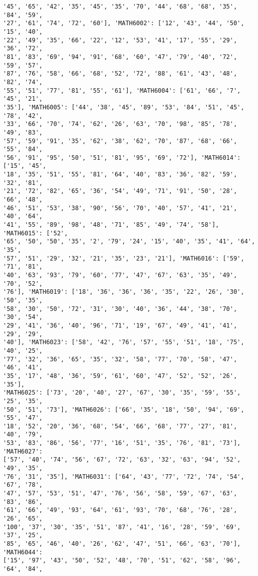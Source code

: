 \documentclass[11pt]{article}
\begin{document}
\begin{Verbatim}[commandchars=\\\{\}]
'45', '65', '42', '35', '45', '35', '70', '44', '68', '68', '35', '84', '59',
'27', '61', '74', '72', '60'], 'MATH6002': ['12', '43', '44', '50', '15', '40',
'22', '49', '35', '66', '22', '12', '53', '41', '17', '55', '29', '36', '72',
'81', '83', '69', '94', '91', '68', '60', '47', '79', '40', '72', '59', '57',
'87', '76', '58', '66', '68', '52', '72', '88', '61', '43', '48', '82', '74',
'55', '51', '77', '81', '55', '61'], 'MATH6004': ['61', '66', '7', '45', '21',
'35'], 'MATH6005': ['44', '38', '45', '89', '53', '84', '51', '45', '78', '42',
'33', '66', '70', '74', '62', '26', '63', '70', '98', '85', '78', '49', '83',
'57', '59', '91', '35', '62', '38', '62', '70', '87', '68', '66', '55', '84',
'56', '91', '95', '50', '51', '81', '95', '69', '72'], 'MATH6014': ['15', '45',
'18', '35', '51', '55', '81', '64', '40', '83', '36', '82', '59', '32', '81',
'21', '72', '82', '65', '36', '54', '49', '71', '91', '50', '28', '66', '48',
'46', '51', '53', '38', '90', '56', '70', '40', '57', '41', '21', '40', '64',
'41', '55', '89', '98', '48', '71', '85', '49', '74', '58'], 'MATH6015': ['52',
'65', '50', '50', '35', '2', '79', '24', '15', '40', '35', '41', '64', '35',
'57', '51', '29', '32', '21', '35', '23', '21'], 'MATH6016': ['59', '71', '81',
'40', '63', '93', '79', '60', '77', '47', '67', '63', '35', '49', '70', '52',
'76'], 'MATH6019': ['18', '36', '36', '36', '35', '22', '26', '30', '50', '35',
'58', '30', '50', '72', '31', '30', '40', '36', '44', '38', '70', '30', '54',
'29', '41', '36', '40', '96', '71', '19', '67', '49', '41', '41', '29', '29',
'40'], 'MATH6023': ['58', '42', '76', '57', '55', '51', '18', '75', '40', '25',
'77', '32', '36', '65', '35', '32', '58', '77', '70', '58', '47', '46', '41',
'35', '17', '48', '36', '59', '61', '60', '47', '52', '52', '26', '35'],
'MATH6025': ['73', '20', '40', '27', '67', '30', '35', '59', '55', '25', '35',
'50', '51', '73'], 'MATH6026': ['66', '35', '18', '50', '94', '69', '55', '47',
'18', '52', '20', '36', '68', '54', '66', '68', '77', '27', '81', '40', '79',
'53', '83', '86', '56', '77', '16', '51', '35', '76', '81', '73'], 'MATH6027':
['57', '40', '74', '56', '67', '72', '63', '32', '63', '94', '52', '49', '35',
'76', '31', '35'], 'MATH6031': ['64', '43', '77', '72', '74', '54', '67', '78',
'47', '57', '53', '51', '47', '76', '56', '58', '59', '67', '63', '83', '86',
'61', '66', '49', '93', '64', '61', '93', '70', '68', '76', '28', '26', '65',
'100', '37', '30', '35', '51', '87', '41', '16', '28', '59', '69', '37', '25',
'85', '65', '46', '40', '26', '62', '47', '51', '66', '63', '70'], 'MATH6044':
['15', '97', '43', '50', '52', '48', '70', '51', '62', '58', '96', '64', '84',

\end{Verbatim}
\end{document}
